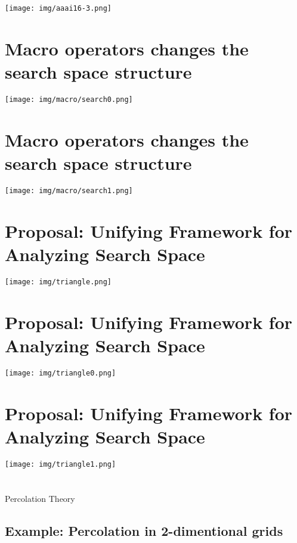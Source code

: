 \texttt{[image: img/aaai16-3.png]}

\section{Macro operators changes the search space structure}
\label{sec-10}

\texttt{[image: img/macro/search0.png]}

\section{Macro operators changes the search space structure}
\label{sec-11}

\texttt{[image: img/macro/search1.png]}

\section{Proposal: Unifying Framework for Analyzing Search Space}
\label{sec-12}

\texttt{[image: img/triangle.png]}

\section{Proposal: Unifying Framework for Analyzing Search Space}
\label{sec-13}

\texttt{[image: img/triangle0.png]}

\section{Proposal: Unifying Framework for Analyzing Search Space}
\label{sec-14}

\texttt{[image: img/triangle1.png]}

\section{}
\label{sec-15}

\begin{xlarge}
\begin{center}
Percolation Theory
\end{center}
\end{xlarge}

\subsection{Example: Percolation in 2-dimentional grids}
\label{sec-15-1}

